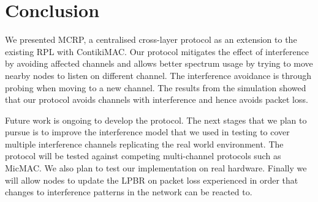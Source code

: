 \section{Conclusion}
\label{sec:conclusion}


We presented MCRP, a centralised cross-layer protocol as an extension to the existing RPL with ContikiMAC. Our protocol mitigates the effect of interference by avoiding affected channels and allows better spectrum usage by trying to move nearby nodes to listen on different channel.  The interference avoidance is through probing when moving to a new channel. The results from the simulation showed that our protocol avoids channels with interference and hence avoids packet loss.

Future work is ongoing to develop the protocol. The next stages that we plan to pursue is to improve the interference model that we used in testing to cover multiple interference channels replicating the real world environment. The protocol will be tested against competing multi-channel protocols such as MicMAC. We also plan to test our implementation on real hardware.  Finally we will allow nodes to update the LPBR on packet loss experienced in order that changes to interference patterns in the network can be reacted to.


